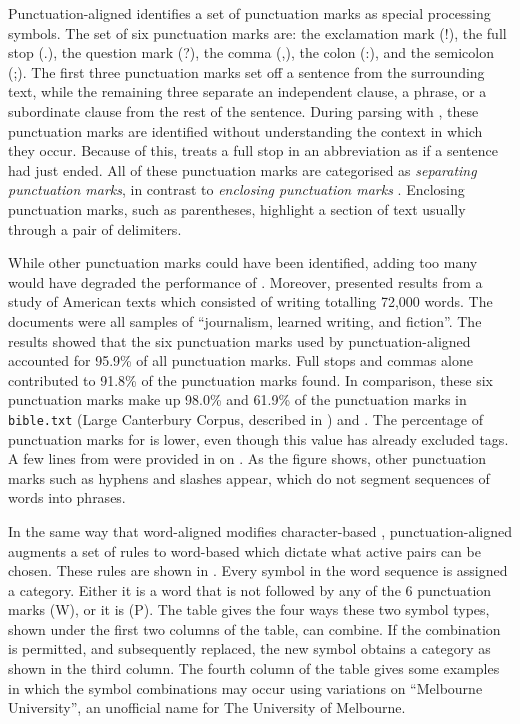 Punctuation-aligned \repair identifies a set of punctuation marks
as special processing symbols.  The set of six punctuation marks
are:  the
exclamation mark (!), the full stop (.), the question mark
(?), the comma (,), the colon (:), and the semicolon (;).
The first three punctuation marks set off a sentence from the
surrounding text, while the remaining three separate an
independent clause, a phrase, or a subordinate clause from the rest
of the sentence.  During parsing with \prepair, these punctuation 
marks are identified without understanding the context in which they
occur.  Because of this, \prepair treats a full stop in an abbreviation
as if a sentence had just ended.
All of these punctuation
marks are categorised as {\emph {separating punctuation marks}},
in contrast to {\emph {enclosing punctuation marks}} 
\citep{greenbaum96:book}.  Enclosing
punctuation marks, such as parentheses, highlight a section of text
usually through a pair of delimiters.

While other punctuation marks could have been identified, adding too
many would have degraded the performance of \prepair.  Moreover, 
\citet{greenbaum96:book} presented results from a study 
of American texts which consisted of writing totalling 72,000 words.
The documents were all samples of ``journalism, learned  writing, 
and fiction''.  The results showed that the six punctuation
marks used by punctuation-aligned \repair accounted for 95.9\% of
all punctuation marks.  Full stops and commas alone contributed to
91.8\% of the punctuation marks found.  In comparison, these six
punctuation marks make up 98.0\% and 61.9\% of the punctuation marks
in {\texttt {bible.txt}} (Large Canterbury Corpus, described in 
) and \wsja.  The percentage of punctuation marks 
for \wsja is lower, even though this value has already excluded \sgml
tags.  A few lines from \wsja were provided in 
 on .  As the
figure shows, other punctuation marks such as hyphens and slashes
appear, which do not segment sequences of words into phrases.

In the same way that word-aligned \repair modifies 
character-based \repair, punctuation-aligned \repair augments
a set of rules to word-based \repair which dictate what
active pairs can be chosen.  These rules are shown in
.  Every symbol in the
word sequence is assigned a category.  Either it is a 
word that is not followed by any of the 6 punctuation
marks (W), or it is (P).  The table gives the four ways
these two symbol types, shown under the first two columns
of the table, can combine.  If the combination is
permitted, and subsequently replaced, the new symbol
obtains a category as shown in the third column.  
The fourth
column of the table gives some examples in which the
symbol combinations may occur using variations on
``Melbourne University'', an unofficial name for The
University of Melbourne.

